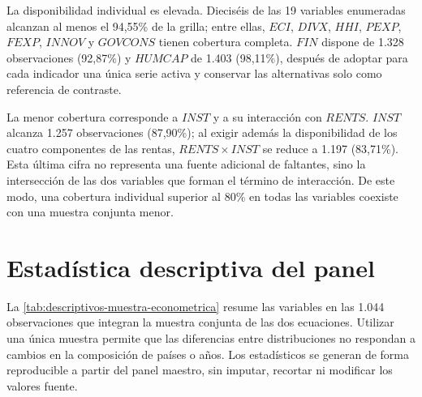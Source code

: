 \documentclass[../../TFM.tex]{subfiles}
\begin{document}
	La disponibilidad individual es elevada. Dieciséis de las 19 variables
	enumeradas alcanzan al menos el 94,55\% de la grilla; entre ellas, $ECI$,
	$DIVX$, $HHI$, $PEXP$, $FEXP$, $INNOV$ y $GOVCONS$ tienen cobertura
	completa. $FIN$ dispone de 1.328 observaciones (92,87\%) y $HUMCAP$ de 1.403
	(98,11\%), después de adoptar para cada indicador una única serie activa y
	conservar las alternativas solo como referencia de contraste.

	La menor cobertura corresponde a $INST$ y a su interacción con $RENTS$.
	$INST$ alcanza 1.257 observaciones (87,90\%); al exigir además la
	disponibilidad de los cuatro componentes de las rentas, $RENTS\times INST$
	se reduce a 1.197 (83,71\%). Esta última cifra no representa una fuente
	adicional de faltantes, sino la intersección de las dos variables que forman
	el término de interacción. De este modo, una cobertura individual superior
	al 80\% en todas las variables coexiste con una muestra conjunta menor.


	\section{Estadística descriptiva del panel}
	\label{sec:estadistica-descriptiva}

	La \autoref{tab:descriptivos-muestra-econometrica} resume las variables en
	las 1.044 observaciones que integran la muestra conjunta de las dos
	ecuaciones. Utilizar una única muestra permite que las diferencias entre
	distribuciones no respondan a cambios en la composición de países o años.
	Los estadísticos se generan de forma reproducible a partir del panel maestro,
	sin imputar, recortar ni modificar los valores fuente.
\end{document}
